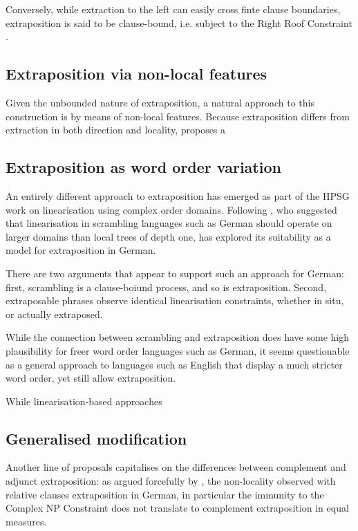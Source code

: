 \documentclass[output=paper
                ,modfonts
                ,nonflat
	        ,collection
	        ,collectionchapter
	        ,collectiontoclongg
 	        ,biblatex
                ,babelshorthands
                ,newtxmath
                ,draftmode
                ,colorlinks, citecolor=brown
]{./langsci/langscibook}
\begin{document}
{Conversely, while extraction to the left can easily cross finte clause
boundaries, extraposition is said to be clause-bound, i.e. subject to
the Right Roof Constraint \citep{}.   



\subsection{Extraposition via non-local features}

Given the unbounded nature of extraposition, a natural approach to
this construction is by means of non-local features. Because
extraposition differs from extraction in both direction and locality,
\citet{Keller95b} %
proposes a  

\subsection{Extraposition as word order variation}

An entirely different approach to extraposition has emerged as part of
the HPSG work on linearisation using complex order domains. Following
\citet{Reape}, who suggested that linearisation in scrambling
languages such as German should operate on larger domains than local
trees of depth one, \citet{} has explored its suitability as a model
for extraposition in German. 

There are two arguments that appear to support such an approach for
German: first, scrambling is a clause-boiund process, and so is
extraposition. Second, extraposable phrases observe identical
linearisation constraints, whether in situ, or actually extraposed.  

While the connection between scrambling and extraposition does have
some high plausibility for freer word order languages such as German,
it seems questionable as a general approach to languages such as
English that display a much stricter word order, yet still allow
extraposition.

While linearisation-based approaches 

\subsection{Generalised modification}

Another line of proposals capitalises on the differences between complement and
adjunct extraposition: as argued forcefully by \citet{},  the
non-locality observed with relative
clauses extraposition in German, in particular the immunity to the
Complex NP Constraint does not translate to complement extraposition
in equal measures. 

}
\end{document}

